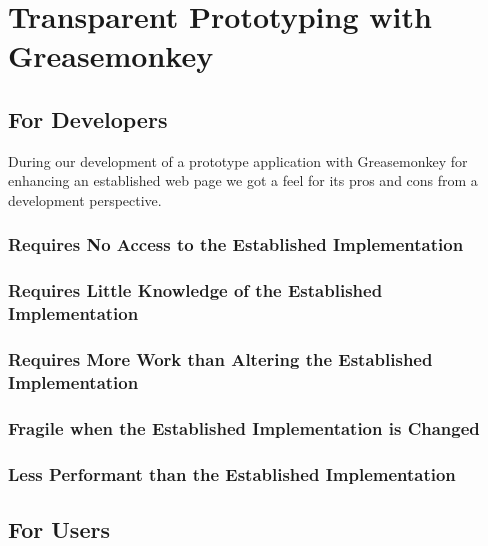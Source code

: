 

\section{Transparent Prototyping with Greasemonkey}

\subsection{For Developers}

During our development of a prototype application with Greasemonkey for
enhancing an established web page we got a feel for its pros and cons from a
development perspective.

\subsubsection{Requires No Access to the Established Implementation}

\subsubsection{Requires Little Knowledge of the Established Implementation}

\subsubsection{Requires More Work than Altering the Established Implementation}

\subsubsection{Fragile when the Established Implementation is Changed}

\subsubsection{Less Performant than the Established Implementation}

\subsection{For Users}

